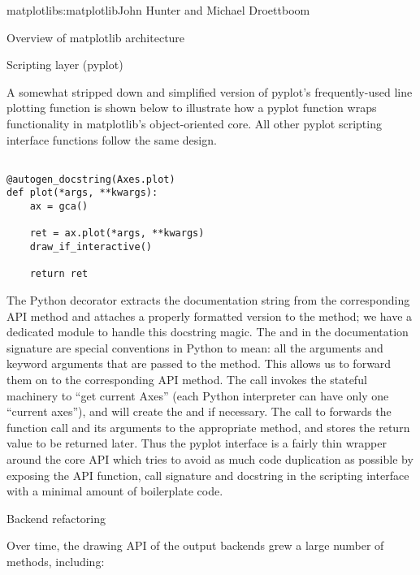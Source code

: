 \begin{aosachapter}{matplotlib}{s:matplotlib}{John Hunter and Michael Droettboom}
\begin{aosasect1}{Overview of matplotlib architecture}
\begin{aosasect2}{Scripting layer (pyplot)}
\begin{aosaitemize}
\end{aosaitemize}

A somewhat stripped down and simplified version of pyplot's
frequently-used line plotting function 
is shown below to illustrate how a pyplot function wraps functionality
in matplotlib's object-oriented core.  All other pyplot scripting
interface functions follow the same design.

\begin{verbatim}

@autogen_docstring(Axes.plot)
def plot(*args, **kwargs):
    ax = gca()

    ret = ax.plot(*args, **kwargs)
    draw_if_interactive()

    return ret

\end{verbatim}

The Python decorator  extracts
the documentation string from the corresponding API method and
attaches a properly formatted version to the 
method; we have a dedicated module  to
handle this docstring magic.  The  and  in
the documentation signature are special conventions in Python to mean:
all the arguments and keyword arguments that are passed to the method.
This allows us to forward them on to the corresponding API method.
The call  invokes the stateful machinery to ``get
current Axes'' (each Python interpreter can have only one ``current
axes''), and will create the  and  if
necessary.  The call to  forwards
the function call and its arguments to the appropriate 
method, and stores the return value to be returned later.  Thus the
pyplot interface is a fairly thin wrapper around the core
 API which tries to avoid as much code duplication as
possible by exposing the API function, call signature and docstring in
the scripting interface with a minimal amount of boilerplate code.


\end{aosasect2}


\end{aosasect1}


\begin{aosasect1}{Backend refactoring}


Over time, the drawing API of the output backends grew a large number
of methods, including:


\end{aosasect1}
\end{aosachapter}
